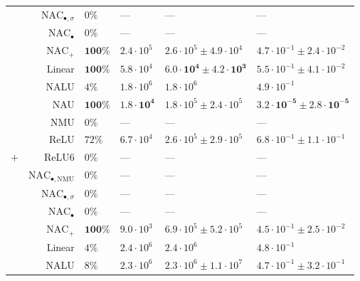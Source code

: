 \begin{table}[!h]
\begin{tabular}{crllll}
 & $\mathrm{NAC}_{\bullet,\sigma}$ & $0\%$ & --- & --- & ---\\

 & $\mathrm{NAC}_{\bullet}$ & $0\%$ & --- & --- & ---\\

 & $\mathrm{NAC}_{+}$ & $\mathbf{100\%}$ & $2.4 \cdot 10^{5}$ & $2.6 \cdot 10^{5} \pm 4.9 \cdot 10^{4}$ & $4.7 \cdot 10^{-1} \pm 2.4 \cdot 10^{-2}$\\

 & Linear & $\mathbf{100\%}$ & $5.8 \cdot 10^{4}$ & $\mathbf{6.0 \cdot 10^{4} \pm 4.2 \cdot 10^{3}}$ & $5.5 \cdot 10^{-1} \pm 4.1 \cdot 10^{-2}$\\

 & NALU & $4\%$ & $1.8 \cdot 10^{6}$ & $1.8 \cdot 10^{6}$ & $4.9 \cdot 10^{-1}$\\

 & NAU & $\mathbf{100\%}$ & $\mathbf{1.8 \cdot 10^{4}}$ & $1.8 \cdot 10^{5} \pm 2.4 \cdot 10^{5}$ & $\mathbf{3.2 \cdot 10^{-5} \pm 2.8 \cdot 10^{-5}}$\\

 & NMU & $0\%$ & --- & --- & ---\\

 & ReLU & $72\%$ & $6.7 \cdot 10^{4}$ & $2.6 \cdot 10^{5} \pm 2.9 \cdot 10^{5}$ & $6.8 \cdot 10^{-1} \pm 1.1 \cdot 10^{-1}$\\

\multirow{-10}{*}{\centering\arraybackslash $\bm{+}$} & ReLU6 & $0\%$ & --- & --- & ---\\
\cmidrule{1-6}
 & $\mathrm{NAC}_{\bullet,\mathrm{NMU}}$ & $0\%$ & --- & --- & ---\\

 & $\mathrm{NAC}_{\bullet,\sigma}$ & $0\%$ & --- & --- & ---\\

 & $\mathrm{NAC}_{\bullet}$ & $0\%$ & --- & --- & ---\\

 & $\mathrm{NAC}_{+}$ & $\mathbf{100\%}$ & $9.0 \cdot 10^{3}$ & $6.9 \cdot 10^{5} \pm 5.2 \cdot 10^{5}$ & $4.5 \cdot 10^{-1} \pm 2.5 \cdot 10^{-2}$\\

 & Linear & $4\%$ & $2.4 \cdot 10^{6}$ & $2.4 \cdot 10^{6}$ & $4.8 \cdot 10^{-1}$\\

 & NALU & $8\%$ & $2.3 \cdot 10^{6}$ & $2.3 \cdot 10^{6} \pm 1.1 \cdot 10^{7}$ & $4.7 \cdot 10^{-1} \pm 3.2 \cdot 10^{-1}$\\


\end{tabular}
\end{table}
